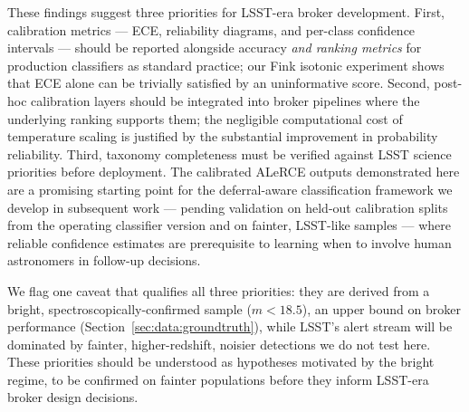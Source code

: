 \documentclass[twocolumn]{aastex631}
\begin{document}
These findings suggest three priorities for LSST-era broker
development. First, calibration metrics — ECE, reliability diagrams,
and per-class confidence intervals — should be reported alongside
accuracy \emph{and ranking metrics} for production classifiers as
standard practice; our Fink isotonic experiment shows that ECE alone
can be trivially satisfied by an uninformative score. Second,
post-hoc calibration layers should be integrated into broker
pipelines where the underlying ranking supports them; the negligible
computational cost of temperature scaling is justified by the
substantial improvement in probability reliability. Third, taxonomy
completeness must be verified against LSST science priorities before
deployment. The calibrated ALeRCE outputs demonstrated here are a
promising starting point for the deferral-aware classification
framework we develop in subsequent work — pending validation on
held-out calibration splits from the operating classifier version
and on fainter, LSST-like samples — where reliable confidence
estimates are prerequisite to learning when to involve human
astronomers in follow-up decisions.

We flag one caveat that qualifies all three priorities: they are
derived from a bright, spectroscopically-confirmed sample
($m < 18.5$), an upper bound on broker performance
(Section~\ref{sec:data:groundtruth}), while LSST's alert stream will
be dominated by fainter, higher-redshift, noisier detections we do
not test here. These priorities should be understood as hypotheses
motivated by the bright regime, to be confirmed on fainter
populations before they inform LSST-era broker design decisions.



\end{document}
